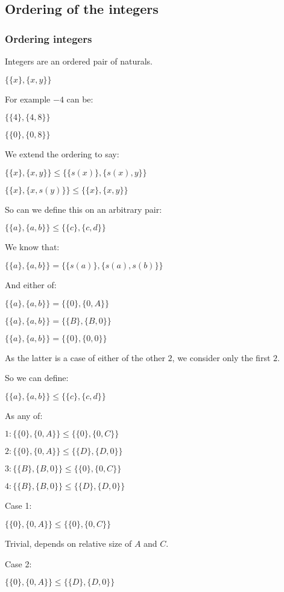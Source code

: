 \subsection{Ordering of the integers}

\subsubsection{Ordering integers}

Integers are an ordered pair of naturals.

$\{\{x\},\{x,y\}\}$

For example \(-4\) can be:

$\{\{4\},\{4,8\}\}$

$\{\{0\},\{0,8\}\}$

We extend the ordering to say:

$\{\{x\},\{x,y\}\}\le \{\{s(x)\},\{s(x),y\}\}$

$\{\{x\},\{x,s(y)\}\}\le \{\{x\},\{x,y\}\}$

So can we define this on an arbitrary pair:

$\{\{a\},\{a,b\}\}\le \{\{c\},\{c,d\}\}$

We know that:

$\{\{a\},\{a,b\}\}=\{\{s(a)\},\{s(a),s(b)\}\}$

And either of:

$\{\{a\},\{a,b\}\}=\{\{0\},\{0,A\}\}$

$\{\{a\},\{a,b\}\}=\{\{B\},\{B,0\}\}$

$\{\{a\},\{a,b\}\}=\{\{0\},\{0,0\}\}$

As the latter is a case of either of the other \(2\), we consider only the first \(2\).

So we can define:

$\{\{a\},\{a,b\}\}\le \{\{c\},\{c,d\}\}$

As any of:

$1: \{\{0\},\{0,A\}\}\le \{\{0\},\{0,C\}\}$

$2: \{\{0\},\{0,A\}\}\le \{\{D\},\{D,0\}\}$

$3: \{\{B\},\{B,0\}\}\le \{\{0\},\{0,C\}\}$

$4: \{\{B\},\{B,0\}\}\le \{\{D\},\{D,0\}\}$

Case 1:

$\{\{0\},\{0,A\}\}\le \{\{0\},\{0,C\}\}$

Trivial, depends on relative size of \(A\) and \(C\).

Case 2:

$\{\{0\},\{0,A\}\}\le \{\{D\},\{D,0\}\}$

